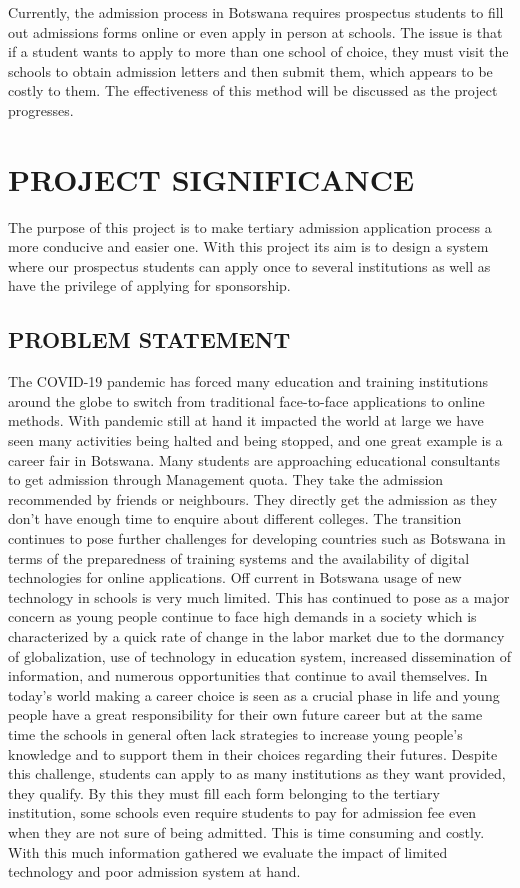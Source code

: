 Currently, the admission process in Botswana requires prospectus students to fill out admissions forms online or even apply in person at schools. The issue is that if a student wants to apply to more than one school of choice, they must visit the schools to obtain admission letters and then submit them, which appears to be costly to them. The effectiveness of this method will be discussed as the project progresses.

\section{PROJECT SIGNIFICANCE}
The purpose of this project is to make tertiary admission application process a more conducive and easier one. With this project its aim is to design a system where our prospectus students can apply once to several institutions as well as have the privilege of applying for sponsorship.
\subsection{PROBLEM STATEMENT}
The COVID-19 pandemic has forced many education and training institutions around the globe to switch from traditional face-to-face applications to online methods. With pandemic still at hand it impacted the world at large we have seen many activities being halted and being stopped, and one great example is a career fair in Botswana. Many students are approaching educational consultants to get admission through Management quota. They take the admission recommended by friends or neighbours. They directly get the admission as they don’t have enough time to enquire about different colleges. The transition continues to pose further challenges for developing countries such as Botswana in terms of the preparedness of training systems and the availability of digital technologies for online applications. Off current in Botswana usage of new technology in schools is very much limited. This has continued to pose as a major concern as young people continue to face high demands in a society which is characterized by a quick rate of change in the labor market due to the dormancy of globalization, use of technology in education system, increased dissemination of information, and numerous opportunities that continue to avail themselves. In today’s world making a career choice is seen as a crucial phase in life and young people have a great responsibility for their own future career but at the same time the schools in general often lack strategies to increase young people’s knowledge and to support them in their choices regarding their futures. Despite this challenge, students can apply to as many institutions as they want provided, they qualify. By this they must fill each form belonging to the tertiary institution, some schools even require students to pay for admission fee even when they are not sure of being admitted. This is time consuming and costly. With this much information gathered we evaluate the impact of limited technology and poor admission system at hand.

